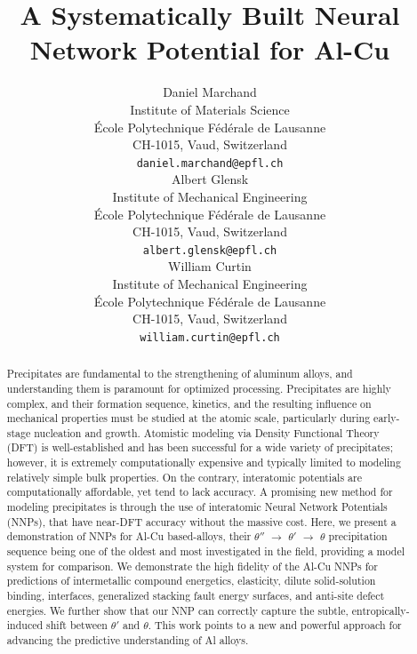 \documentclass{article}
\title{A Systematically Built Neural Network Potential for Al-Cu}
\author{
 Daniel Marchand \\
  Institute of Materials Science \\
  École Polytechnique Fédérale de Lausanne \\
  CH-1015, Vaud, Switzerland \\
  \texttt{daniel.marchand@epfl.ch} \\
   \And
 Albert Glensk \\
  Institute of Mechanical Engineering \\
  École Polytechnique Fédérale de Lausanne \\
  CH-1015, Vaud, Switzerland \\
  \texttt{albert.glensk@epfl.ch} \\
  \And
 William Curtin \\
  Institute of Mechanical Engineering \\
  École Polytechnique Fédérale de Lausanne \\
  CH-1015, Vaud, Switzerland \\
  \texttt{william.curtin@epfl.ch} \\
}
\begin{document}
\maketitle
\begin{abstract}
Precipitates are fundamental to the strengthening of aluminum alloys, and understanding them is paramount for optimized processing.
Precipitates are highly complex, and their formation sequence, kinetics, and the resulting influence on mechanical properties must be studied at the atomic scale, particularly during early-stage nucleation and growth.
Atomistic modeling via Density Functional Theory (DFT) is well-established and has been successful for a wide variety of precipitates; however, it is extremely computationally expensive and typically limited to modeling relatively simple bulk properties. On the contrary, interatomic potentials are computationally affordable, yet tend to lack accuracy. A promising new method for modeling precipitates is through the use of interatomic Neural Network Potentials (NNPs), that have near-DFT accuracy without the massive cost. 
Here, we present a demonstration of NNPs for Al-Cu based-alloys, 
their $\theta''$ $\rightarrow$ $\theta'$ $\rightarrow$ $\theta$ precipitation sequence
being one of the oldest and most investigated in the field, providing a model system for comparison.
We demonstrate the high fidelity of the Al-Cu NNPs for predictions of intermetallic compound energetics, elasticity, dilute solid-solution binding, interfaces, generalized stacking fault energy surfaces, and anti-site defect energies.
We further show that our NNP can correctly capture the subtle, entropically-induced shift between $\theta'$ and $\theta$.
This work points to a new and powerful approach for advancing the predictive understanding of Al alloys. 
\end{abstract}


\end{document}
